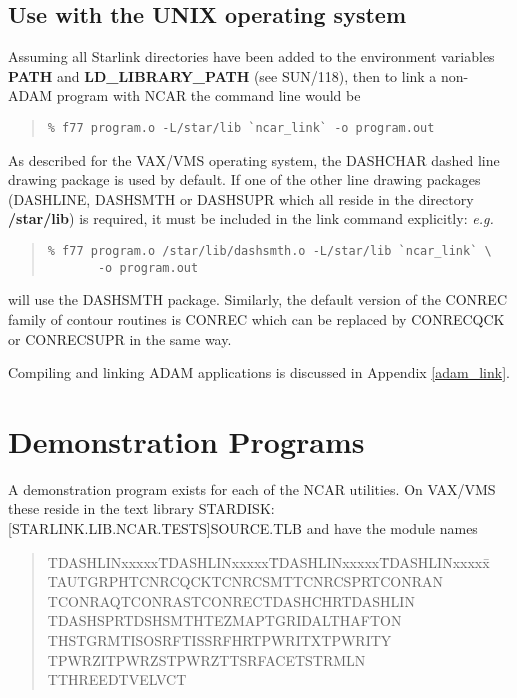 \subsection{Use with the UNIX operating system}

\begin{sloppypar}
Assuming all Starlink directories have been added to the environment variables
{\bf PATH} and {\bf LD\_LIBRARY\_PATH} (see SUN/118), then to link a non-ADAM
program with NCAR the command line would be
\end{sloppypar}

\begin {quote}
\begin {small}
\begin{verbatim}
% f77 program.o -L/star/lib `ncar_link` -o program.out
\end{verbatim}
\end {small}
\end {quote}

As described for the VAX/VMS operating system, the DASHCHAR dashed line drawing
package is used by default.
If one of the other line drawing packages (DASHLINE, DASHSMTH or DASHSUPR which
all reside in the directory {\bf /star/lib}) 
is required, it must be included in the link command explicitly: {\em e.g.}

\begin{quote}
\begin{verbatim}
% f77 program.o /star/lib/dashsmth.o -L/star/lib `ncar_link` \
       -o program.out
\end{verbatim}
\end{quote}

will use the DASHSMTH package.
Similarly, the default version of the CONREC family of contour routines is
CONREC which can be replaced by CONRECQCK or CONRECSUPR in the same way.

Compiling and linking ADAM applications is discussed in Appendix
\ref{adam_link}.


\section{Demonstration Programs}

A demonstration program exists for each of the NCAR utilities.
On VAX/VMS these reside in the text library 
STARDISK:[STARLINK.LIB.NCAR.TESTS]SOURCE.TLB and have the module names

\begin{quote}
\begin{tabbing}
TDASHLINxxxxx\=TDASHLINxxxxx\=TDASHLINxxxxx\=TDASHLINxxxxx\=\kill
TAUTGRPH\>TCNRCQCK\>TCNRCSMT\>TCNRCSPR\>TCONRAN\\
TCONRAQ\>TCONRAS\>TCONREC\>TDASHCHR\>TDASHLIN\\
TDASHSPR\>TDSHSMTH\>TEZMAP\>TGRIDAL\>THAFTON\\
THSTGRM\>TISOSRF\>TISSRFHR\>TPWRITX\>TPWRITY\\
TPWRZI\>TPWRZS\>TPWRZT\>TSRFACE\>TSTRMLN\\
TTHREED\>TVELVCT
\end{tabbing}
\end{quote}

